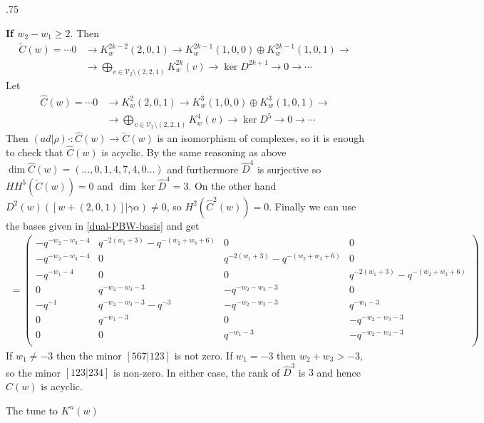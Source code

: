 \documentclass[11pt,fleqn]{article}
\makeatletter
\renewenvironment{proof}[1][\proofname]{\par
  \pushQED{\qed}%
  \normalfont \topsep.75\paraskip\relax
  \trivlist
  \item[\hskip\labelsep
        \itshape
    #1\@addpunct{.}]\ignorespaces
}{%
  \popQED\endtrivlist\@endpefalse
}
\newcommand\V{\mathcal V}
\renewcommand\to{\longrightarrow}
\makeatother
\begin{document}
\begin{proof}
\textbf{If $w_2 - w_1 \geq 2$}. Then 
\begin{align*}
\tilde C(w)
  = \cdots 0 &\to 
   K^{2k-2}_w(2,0,1) \to
    K^{2k-1}_w(1,0,0) \oplus K^{2k-1}_w(1,0,1) \to \\
    & \to \bigoplus_{v \in \V_2 \setminus (2,2,1)} K^{2k}_w(v)
      \to \ker D^{2k+1} \to 0 \to \cdots
\end{align*}
Let
\begin{align*}
\hat C(w)
  = \cdots 0 &\to 
   K^{2}_w(2,0,1) \to
    K^{3}_w(1,0,0) \oplus K^{3}_w(1,0,1) \to \\
    & \to \bigoplus_{v \in \V_2 \setminus (2,2,1)} K^{4}_w(v)
      \to \ker D^{5} \to 0 \to \cdots
\end{align*}
Then $(ad|\rho)\cdot : \hat C(w) \to \tilde C(w)$ is an isomorphism of complexes, so it 
is enough to check that $\hat C(w)$ is acyclic. By the same reasoning as above $\dim \hat
C(w) = (\ldots, 0, 1,4,7,4, 0 \ldots)$ and furthermore $\hat D^{4}$ is surjective so 
$HH^5(\tilde C(w)) = 0$ and $\dim \ker \hat D^4 = 3$. On the other hand 
$D^2(w)([w+(2,0,1)]|\gamma \alpha) \neq 0$, so $H^2(\hat C^2(w)) = 0$. Finally we can 
use the bases given in \ref{dual-PBW-basis} and get
\begin{align*}
[\hat D^3]
  =
\left(
\begin{array}{cccc}
 -q^{-w_2-w_3-4} & q^{-2 (w_1+3)}-q^{-(w_2+w_3+6)} & 0 & 0 \\
 -q^{-w_2-w_3-4} & 0 & q^{-2 (w_1+3)}-q^{-(w_2+w_3+6)} & 0 \\
 -q^{-w_1-4} & 0 & 0 & q^{-2 (w_1+3)}-q^{-(w_2+w_3+6)} \\
 0 & q^{-w_2-w_3-3} & -q^{-w_2-w_3-3} & 0 \\
 -q^{-1} & q^{-w_2-w_3-3}-q^{-3} & -q^{-w_2-w_3-3} & q^{-w_1-3} \\
 0 & q^{-w_1-3} & 0 & -q^{-w_2-w_3-3} \\
 0 & 0 & q^{-w_1-3} & -q^{-w_2-w_3-3} \\
\end{array}
\right)
\end{align*}
If $w_1 \neq -3$ then the minor $[567|123]$ is not zero. If $w_1 = - 3$ then $w_2 + w_3 
> -3$, so the minor $[123|234]$ is non-zero. In either case, the rank of $\hat D^3$ is 
$3$ and hence $\hat C(w)$ is acyclic.
\end{proof}



\newpage

\newpage

The tune to $K^n(w)$
\end{document}
